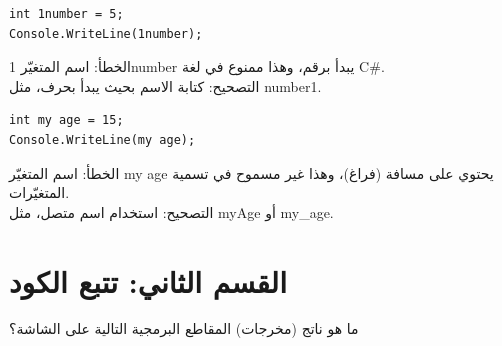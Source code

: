 \documentclass[14pt]{extarticle}
\begin{document}
\begin{enumerate}[itemsep=2em]
\begin{english}
    \item
\begin{verbatim}
int 1number = 5;
Console.WriteLine(1number);
\end{verbatim}
\end{english}
\ifwithsols
\begin{boxSolution}
الخطأ: اسم المتغيّر \textenglish{1number} يبدأ برقم، وهذا ممنوع في لغة \textenglish{C\#}. \\
التصحيح: كتابة الاسم بحيث يبدأ بحرف، مثل \textenglish{number1}.
\end{boxSolution}
\fi

\begin{english}
    \item
\begin{verbatim}
int my age = 15;
Console.WriteLine(my age);
\end{verbatim}
\end{english}
\ifwithsols
\begin{boxSolution}
الخطأ: اسم المتغيّر \textenglish{my age} يحتوي على مسافة (فراغ)، وهذا غير مسموح في تسمية المتغيّرات. \\
التصحيح: استخدام اسم متصل، مثل \textenglish{myAge} أو \textenglish{my\_age}.
\end{boxSolution}
\fi

\end{enumerate}

\clearpage

\section*{القسم الثاني: تتبع الكود}
ما هو ناتج (مخرجات) المقاطع البرمجية التالية على الشاشة؟
\end{document}
